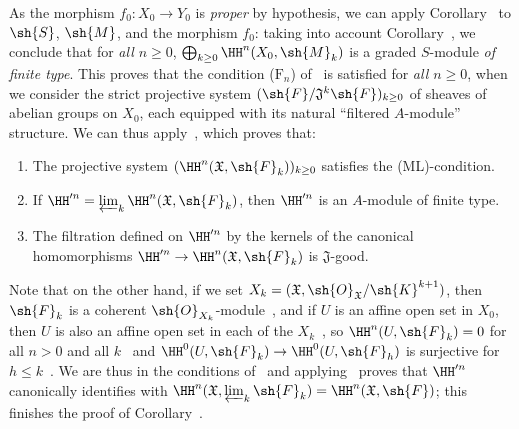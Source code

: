 As the morphism $f_0:X_0\to Y_0$ is \emph{proper} by hypothesis, we can apply Corollary~ to $\sh{S}$, $\sh{M}$, and the morphism $f_0$: taking into account Corollary~, we conclude that for \emph{all $n\geq 0$}, $\bigoplus_{k\geq 0}\HH^n(X_0,\sh{M}_k)$ is a graded $S$-module \emph{of finite type}.
This proves that the condition ($\text{F}_n$) of~ is satisfied for \emph{all $n\geq 0$}, when we consider the strict projective system $(\sh{F}/\mathfrak{J}^k\sh{F})_{k\geq 0}$ of sheaves of abelian groups on $X_0$, each equipped with its natural ``filtered $A$-module'' structure.
We can thus apply~, which proves that:
\begin{enumerate}
  \item[1st.] The projective system $(\HH^n(\mathfrak{X},\sh{F}_k))_{k\geq 0}$ satisfies the (ML)-condition.
  \item[2nd.] If $\HH^{\prime n}=\varprojlim_k\HH^n(\mathfrak{X},\sh{F}_k)$, then $\HH^{\prime n}$ is an $A$-module of finite type.
  \item[3rd.] The filtration defined on $\HH^{\prime n}$ by the kernels of the canonical homomorphisms $\HH^{\prime n}\to\HH^n(\mathfrak{X},\sh{F}_k)$ is $\mathfrak{J}$-good.
\end{enumerate}

Note that on the other hand, if we set $X_k=(\mathfrak{X},\sh{O}_\mathfrak{X}/\sh{K}^{k+1})$, then $\sh{F}_k$ is a coherent $\sh{O}_{X_k}$-module~, and if $U$ is an affine open set in $X_0$, then $U$ is also an affine open set in each of the $X_k$~, so $\HH^n(U,\sh{F}_k)=0$ for all $n>0$ and all $k$~ and $\HH^0(U,\sh{F}_k)\to\HH^0(U,\sh{F}_h)$ is surjective for $h\leq k$~.
We are thus in the conditions of~ and applying~ proves that $\HH^{\prime n}$ canonically identifies with $\HH^n(\mathfrak{X},\varprojlim_k\sh{F}_k)=\HH^n(\mathfrak{X},\sh{F})$; this finishes the proof of Corollary~.

